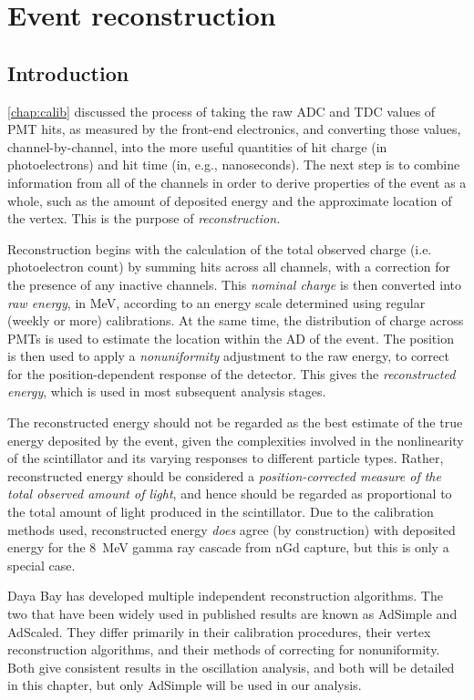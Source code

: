 \documentclass[../thesis.tex]{subfiles}
\begin{document}
\chapter{Event reconstruction}
\label{chap:recon}

\section{Introduction}
\label{sec:reconIntro}

\autoref{chap:calib} discussed the process of taking the raw ADC and TDC values of PMT hits, as measured by the front-end electronics, and converting those values, channel-by-channel, into the more useful quantities of hit charge (in photoelectrons) and hit time (in, e.g., nanoseconds). The next step is to combine information from all of the channels in order to derive properties of the event as a whole, such as the amount of deposited energy and the approximate location of the vertex. This is the purpose of \emph{reconstruction.}

Reconstruction begins with the calculation of the total observed charge (i.e. photoelectron count) by summing hits across all channels, with a correction for the presence of any inactive channels. This \emph{nominal charge} is then converted into \emph{raw energy}, in MeV, according to an energy scale determined using regular (weekly or more) calibrations. At the same time, the distribution of charge across PMTs is used to estimate the location within the AD of the event. The position is then used to apply a \emph{nonuniformity} adjustment to the raw energy, to correct for the position-dependent response of the detector. This gives the \emph{reconstructed energy}, which is used in most subsequent analysis stages.

The reconstructed energy should not be regarded as the best estimate of the true energy deposited by the event, given the complexities involved in the nonlinearity of the scintillator and its varying responses to different particle types. Rather, reconstructed energy should be considered a \emph{position-corrected measure of the total observed amount of light}, and hence should be regarded as proportional to the total amount of light produced in the scintillator. Due to the calibration methods used, reconstructed energy \emph{does} agree (by construction) with deposited energy for the 8~MeV gamma ray cascade from nGd capture, but this is only a special case.

Daya Bay has developed multiple independent reconstruction algorithms. The two that have been widely used in published results are known as AdSimple and AdScaled. They differ primarily in their calibration procedures, their vertex reconstruction algorithms, and their methods of correcting for nonuniformity. Both give consistent results in the oscillation analysis, and both will be detailed in this chapter, but only AdSimple will be used in our analysis.
\end{document}
